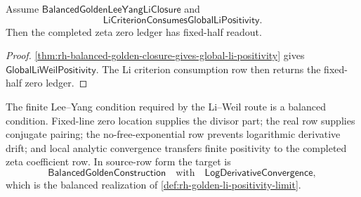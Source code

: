 \begin{corollary}
\label{cor:rh-balanced-golden-closure-fixed-half-readout}
Assume $\mathsf{BalancedGoldenLeeYangLiClosure}$ and
$$
\mathsf{LiCriterionConsumesGlobalLiPositivity}.
$$
Then the completed zeta zero ledger has fixed-half readout.
\end{corollary}

\begin{proof}
\autoref{thm:rh-balanced-golden-closure-gives-global-li-positivity}
gives $\mathsf{GlobalLiWeilPositivity}$.  The Li criterion consumption
row then returns the fixed-half zero ledger.
\end{proof}

\begin{principle}
\label{prin:rh-balanced-li-closure-target}
The finite Lee--Yang condition required by the Li--Weil route is a
balanced condition.  Fixed-line zero location supplies the divisor
part; the real row supplies conjugate pairing; the no-free-exponential
row prevents logarithmic derivative drift; and local analytic
convergence transfers finite positivity to the completed zeta
coefficient row.  In source-row form the target is
$$
\mathsf{BalancedGoldenConstruction}
\quad
\text{with}
\quad
\mathsf{LogDerivativeConvergence},
$$
which is the balanced realization of
\autoref{def:rh-golden-li-positivity-limit}.
\end{principle}
